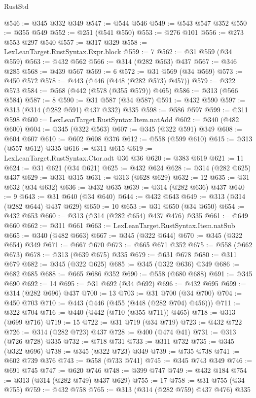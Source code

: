 \begin{lexlean}{RustStd}
\begin{coremodule}
@546 := @345 @332 @349
@547 := @544 @546
@549 := @543 @547 @352
@550 := @355 @549
@552 := @251 (@541 @550)
@553 := @276 @101
@556 := @273 @553 @297 @540
@557 := @317 @329
@558 := LexLeanTarget.RustSyntax.Expr.block
@559 := 7
@562 := @31 @559 (@34 @559)
@563 := @432 @562
@566 := @314 (@282 @563) @437
@567 := @346 @285
@568 := @439 @567
@569 := 6
@572 := @31 @569 (@34 @569)
@573 := @450 @572
@578 := @443 (@446 (@448 (@282 @573) @457))
@579 := @322 @573
@584 := @568 (@442 (@578 (@355 @579)) @465)
@586 := @313 (@566 @584)
@587 := 8
@590 := @31 @587 (@34 @587)
@591 := @432 @590
@597 := @313 (@314 (@282 @591) @437 @332) @335
@598 := @586 @597
@599 := @311 @598
@600 := LexLeanTarget.RustSyntax.Item.natAdd
@602 := @340 (@482 @600)
@604 := @345 (@322 @563)
@607 := @345 (@322 @591) @349
@608 := @604 @607
@610 := @602 @608 @376
@612 := @558 (@599 @610)
@615 := @313 (@557 @612) @335
@616 := @311 @615
@619 := LexLeanTarget.RustSyntax.Ctor.adt @36 @36
@620 := @383 @619
@621 := 11
@624 := @31 @621 (@34 @621)
@625 := @432 @624
@628 := @314 (@282 @625) @437
@629 := @331 @315
@631 := @313 (@628 @629)
@632 := 12
@635 := @31 @632 (@34 @632)
@636 := @432 @635
@639 := @314 (@282 @636) @437
@640 := 9
@643 := @31 @640 (@34 @640)
@644 := @432 @643
@649 := @313 (@314 (@282 @644) @437 @629)
@650 := 10
@653 := @31 @650 (@34 @650)
@654 := @432 @653
@660 := @313 (@314 (@282 @654) @437 @476) @335
@661 := @649 @660
@662 := @311 @661
@663 := LexLeanTarget.RustSyntax.Item.natSub
@665 := @340 (@482 @663)
@667 := @345 (@322 @644)
@670 := @345 (@322 @654) @349
@671 := @667 @670
@673 := @665 @671 @352
@675 := @558 (@662 @673)
@678 := @313 (@639 @675) @335
@679 := @631 @678
@680 := @311 @679
@682 := @345 (@322 @625)
@685 := @345 (@322 @636) @349
@686 := @682 @685
@688 := @665 @686 @352
@690 := @558 (@680 @688)
@691 := @345 @690
@692 := 14
@695 := @31 @692 (@34 @692)
@696 := @432 @695
@699 := @314 (@282 @696) @437
@700 := 13
@703 := @31 @700 (@34 @700)
@704 := @450 @703
@710 := @443 (@446 (@455 (@448 (@282 @704) @456)))
@711 := @322 @704
@716 := @440 (@442 (@710 (@355 @711)) @465)
@718 := @313 (@699 @716)
@719 := 15
@722 := @31 @719 (@34 @719)
@723 := @432 @722
@726 := @314 (@282 @723) @437
@728 := @400 (@474 @41)
@731 := @313 (@726 @728) @335
@732 := @718 @731
@733 := @311 @732
@735 := @345 (@322 @696)
@738 := @345 (@322 @723) @349
@739 := @735 @738
@741 := @602 @739 @376
@743 := @558 (@733 @741)
@745 := @345 @743 @349
@746 := @691 @745
@747 := @620 @746
@748 := @399 @747
@749 := @432 @184
@754 := @313 (@314 (@282 @749) @437 @629)
@755 := 17
@758 := @31 @755 (@34 @755)
@759 := @432 @758
@765 := @313 (@314 (@282 @759) @437 @476) @335

\end{coremodule}
\end{lexlean}
